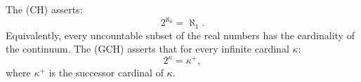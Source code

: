 The  (CH) asserts:
$$2^{\aleph_0} = \aleph_1.$$
Equivalently, every uncountable subset of the real numbers has the cardinality of the continuum. The  (GCH) asserts that for every infinite cardinal $\kappa$:
$$2^{\kappa} = \kappa^+,$$
where $\kappa^+$ is the successor cardinal of $\kappa$.
